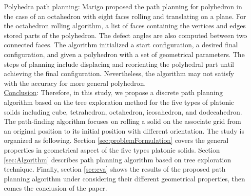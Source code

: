 \noindent \uline{Polyhedra path planning}:
Marigo \cite{Marigo00_PlanningMotion_Polyhedra_Rolling} proposed the path planning for polyhedron in the case of an octahedron with eight faces rolling and translating on a plane. 
For the octahedron rolling algorithm, a list of faces containing the vertices and edges stored parts of the polyhedron. 
The defect angles are also computed between two connected faces.
The algorithm initialized a start configuration, a desired final configuration, and given a polyhedron with a set of geometrical parameters. 
The steps of planning include displacing and reorienting the polyhedral part until achieving the final configuration. 
Nevertheless, the algorithm may not satisfy with the accuracy for more general polyhedron.\\

\noindent \uline{Conclusion}:
Therefore, in this study, we propose a discrete path planning algorithm based on the tree exploration method for the five types of platonic solids including cube, tetrahedron, octahedron, icosahedron, and dodecahedron. The path-finding algorithm focuses on rolling a solid on the associate grid from an original position to its initial position with different orientation. 
%
The study is organized as following. Section \ref{sec:problemFormulation} covers the general properties in geometrical aspect of the five types platonic solids. Section \ref{sec:Algorithm} describes path planning algorithm based on tree exploration technique. Finally, section \ref{sec:eva} shows the results of the proposed path planning algorithm under considering their different geometrical properties, then comes the conclusion of the paper.

